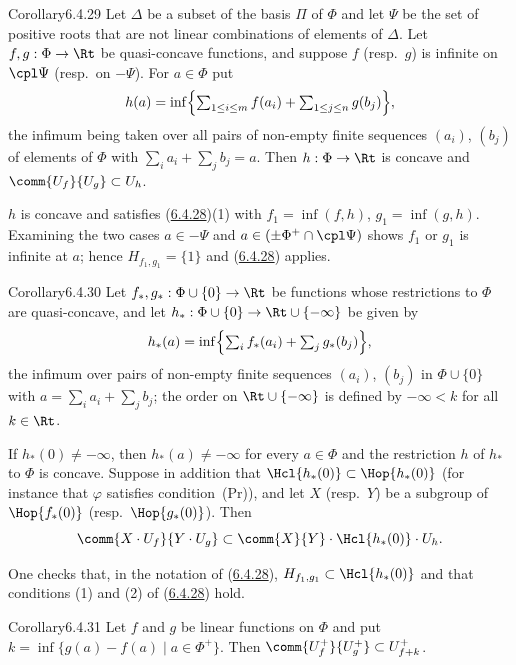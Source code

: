 \documentclass[12pt,a4paper,oneside,english]{smfart}
\makeatletter
\newcommand{\btanchor}[1]{\leavevmode\Hy@raisedlink{\hypertarget{bt:#1}{}}}
\newcommand{\btref}[1]{\hyperlink{bt:#1}{#1}}
\theoremstyle{definition}
\theoremstyle{bt}
\makeatother
\begin{document}
\begin{bt}{Corollary}{6.4.29}\btanchor{6.4.29}
Let $\Delta$ be a subset of the basis $\Pi$ of $\Phi$ and let $\Psi$ be
the set of positive roots that are not linear combinations of elements
of $\Delta$. Let $f,g:\Phi\to\Rt$ be quasi-concave functions, and
suppose $f$ (resp.\ $g$) is infinite on $\cpl\Psi$ (resp.\ on $-\Psi$).
For $a\in\Phi$ put
\[
  h(a)=\inf\Bigl\{\textstyle\sum_{1\le i\le m}f(a_i)         +\sum_{1\le j\le n}g(b_j)\Bigr\},
\]
the infimum being taken over all pairs of non-empty finite sequences
$(a_i)$, $(b_j)$ of elements of $\Phi$ with
$\sum_i a_i+\sum_j b_j=a$. Then $h:\Phi\to\Rt$ is concave and
$\comm{U_f}{U_g}\subset U_h$.
\end{bt}

\begin{sketch}
$h$ is concave and satisfies (\btref{6.4.28})(1) with $f_1=\inf(f,h)$,
$g_1=\inf(g,h)$. Examining the two cases $a\in-\Psi$ and
$a\in(\pm\Phi^{+}\cap\cpl\Psi)$ shows $f_1$ or $g_1$ is infinite at $a$;
hence $H_{f_1,g_1}=\{1\}$ and (\btref{6.4.28}) applies.
\end{sketch}

\begin{bt}{Corollary}{6.4.30}\btanchor{6.4.30}
Let $f_{*},g_{*}:\Phi\cup\{0\}\to\Rt$ be functions whose restrictions to
$\Phi$ are quasi-concave, and let
$h_{*}:\Phi\cup\{0\}\to\Rt\cup\{-\infty\}$ be given by
\[
  h_{*}(a)=\inf\Bigl\{\textstyle\sum_i f_{*}(a_i)+\sum_j g_{*}(b_j)\Bigr\},
\]
the infimum over pairs of non-empty finite sequences $(a_i)$, $(b_j)$ in
$\Phi\cup\{0\}$ with $a=\sum_i a_i+\sum_j b_j$; the order on
$\Rt\cup\{-\infty\}$ is defined by $-\infty<k$ for all $k\in\Rt$.

If $h_{*}(0)\ne-\infty$, then $h_{*}(a)\ne-\infty$ for every $a\in\Phi$
and the restriction $h$ of $h_{*}$ to $\Phi$ is concave. Suppose in
addition that $\Hcl{h_{*}(0)}\subset\Hop{h_{*}(0)}$ (for instance that
$\varphi$ satisfies condition~(Pr)), and let $X$ (resp.\ $Y$) be a
subgroup of $\Hop{f_{*}(0)}$ (resp.\ $\Hop{g_{*}(0)}$). Then
\[
  \comm{X\cdot U_f}{Y\cdot U_g}\subset
  \comm{X}{Y}\cdot \Hcl{h_{*}(0)}\cdot U_h .
\]
\end{bt}

\begin{sketch}
One checks that, in the notation of (\btref{6.4.28}),
$H_{f_1,g_1}\subset \Hcl{h_{*}(0)}$ and that conditions (1) and (2) of
(\btref{6.4.28}) hold.
\end{sketch}

\begin{bt}{Corollary}{6.4.31}\btanchor{6.4.31}
Let $f$ and $g$ be linear functions on $\Phi$ and put
$k=\inf\{g(a)-f(a)\mid a\in\Phi^{+}\}$. Then
$\comm{U^{+}_{f}}{U^{+}_{g}}\subset U^{+}_{f+k}$.
\end{bt}
\end{document}

